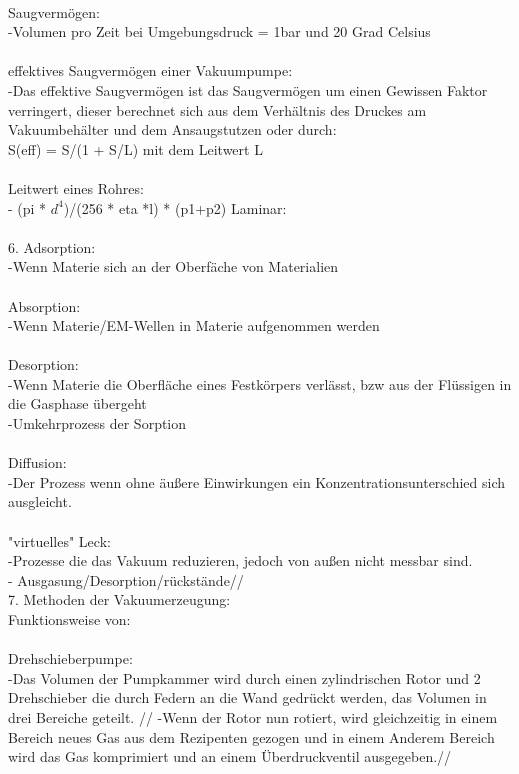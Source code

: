 \\
	   Saugvermögen:\\
	   	-Volumen pro Zeit bei Umgebungsdruck = 1bar und 20 Grad Celsius\\
\\
	   effektives Saugvermögen einer Vakuumpumpe:\\
	   	-Das effektive Saugvermögen ist das Saugvermögen um einen Gewissen Faktor verringert, dieser berechnet sich aus dem Verhältnis des Druckes am Vakuumbehälter und dem Ansaugstutzen oder durch:\\
			S(eff) = S/(1 + S/L) mit dem Leitwert L\\
\\
	   Leitwert eines Rohres:\\
		- (pi * $d^4$)/(256 * eta *l) * (p1+p2) Laminar:\\
\\
	6. Adsorption:\\
		-Wenn Materie sich an der Oberfäche von Materialien \\ 
\\
	   Absorption:\\
		-Wenn Materie/EM-Wellen in Materie aufgenommen werden\\
\\
	   Desorption:\\
		-Wenn Materie die Oberfläche eines Festkörpers verlässt, bzw aus der Flüssigen in die Gasphase übergeht\\
		-Umkehrprozess der Sorption\\
\\
	   Diffusion:\\
		-Der Prozess wenn ohne äußere Einwirkungen ein Konzentrationsunterschied sich ausgleicht.\\
		\\
	   "virtuelles" Leck:\\
	   	-Prozesse die das Vakuum reduzieren, jedoch von außen nicht messbar sind.\\
		- Ausgasung/Desorption/rückstände//
\\
	7. Methoden der Vakuumerzeugung:\\
		Funktionsweise von:\\
\\
		Drehschieberpumpe:\\
			-Das Volumen der Pumpkammer wird durch einen zylindrischen Rotor und 2 Drehschieber die durch Federn an die Wand gedrückt werden, das Volumen in drei Bereiche geteilt. //
			-Wenn der Rotor nun rotiert, wird gleichzeitig in einem Bereich neues Gas aus dem Rezipenten gezogen und in einem Anderem Bereich wird das Gas komprimiert und an einem Überdruckventil ausgegeben.//
